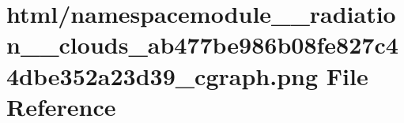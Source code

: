 \hypertarget{namespacemodule____radiation____clouds__ab477be986b08fe827c44dbe352a23d39__cgraph_8png}{}\section{html/namespacemodule\+\_\+\+\_\+radiation\+\_\+\+\_\+clouds\+\_\+ab477be986b08fe827c44dbe352a23d39\+\_\+cgraph.png File Reference}
\label{namespacemodule____radiation____clouds__ab477be986b08fe827c44dbe352a23d39__cgraph_8png}
